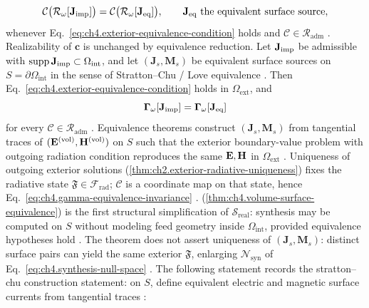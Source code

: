 \begin{equation}
\label{eq:ch4.coefficient-equivalence-invariance}
\mathcal{C}\big(\mathcal{R}_\omega[\mathbf{J}_{\mathrm{imp}}]\big)
=
\mathcal{C}\big(\mathcal{R}_\omega[\mathbf{J}_{\mathrm{eq}}]\big),
\qquad
\mathbf{J}_{\mathrm{eq}}\ \text{the equivalent surface source},
\end{equation}
whenever Eq.~\eqref{eq:ch4.exterior-equivalence-condition} holds and \(\mathcal{C}\in\mathcal{R}_{\mathrm{adm}}\)
\cite{hansen1988}. Realizability of \(\mathbf{c}\) is unchanged by equivalence reduction.
\label{thm:ch4.volume-surface-equivalence}
Let \(\mathbf{J}_{\mathrm{imp}}\) be admissible with \(\operatorname{supp}\mathbf{J}_{\mathrm{imp}}\subset\Omega_{\mathrm{int}}\), and let
\((\mathbf{J}_{s},\mathbf{M}_{s})\) be equivalent surface sources on \(S=\partial\Omega_{\mathrm{int}}\) in the
sense of Stratton--Chu / Love equivalence \cite{stratton1941}. Then
Eq.~\eqref{eq:ch4.exterior-equivalence-condition} holds in \(\Omega_{\mathrm{ext}}\), and
\begin{equation}
\label{eq:ch4.gamma-equivalence-invariance}
\boldsymbol{\Gamma}_\omega[\mathbf{J}_{\mathrm{imp}}]
=
\boldsymbol{\Gamma}_\omega[\mathbf{J}_{\mathrm{eq}}]
\end{equation}
for every \(\mathcal{C}\in\mathcal{R}_{\mathrm{adm}}\) \cite{stratton1941}.
Equivalence theorems construct \((\mathbf{J}_{s},\mathbf{M}_{s})\) from tangential traces of
\((\mathbf{E}^{\mathrm{(vol)}},\mathbf{H}^{\mathrm{(vol)}})\) on \(S\) such that the exterior boundary-value problem with
outgoing radiation condition reproduces the same \(\mathbf{E},\mathbf{H}\) in \(\Omega_{\mathrm{ext}}\)
\cite{stratton1941}. Uniqueness of outgoing exterior solutions
(\ref{thm:ch2.exterior-radiative-uniqueness}) fixes the radiative state
\(\mathfrak{F}\in\mathcal{F}_{\mathrm{rad}}\); \(\mathcal{C}\) is a coordinate map on that state, hence
Eq.~\eqref{eq:ch4.gamma-equivalence-invariance} \cite{stratton1941}.
(\ref{thm:ch4.volume-surface-equivalence}) is the first structural simplification of $\mathcal{S}_{\mathrm{real}}$:
synthesis may be computed on \(S\) without modeling feed geometry inside \(\Omega_{\mathrm{int}}\), provided
equivalence hypotheses hold \cite{collin2001}. The theorem does not assert uniqueness of
\((\mathbf{J}_{s},\mathbf{M}_{s})\): distinct surface pairs can yield the same exterior
\(\mathfrak{F}\), enlarging \(\mathcal{N}_{\mathrm{syn}}\) of Eq.~\eqref{eq:ch4.synthesis-null-space}
\cite{harrington2001}.
The following statement records the stratton--chu construction statement: on \(S\), define equivalent electric and magnetic surface currents from tangential traces
\cite{stratton1941}:
